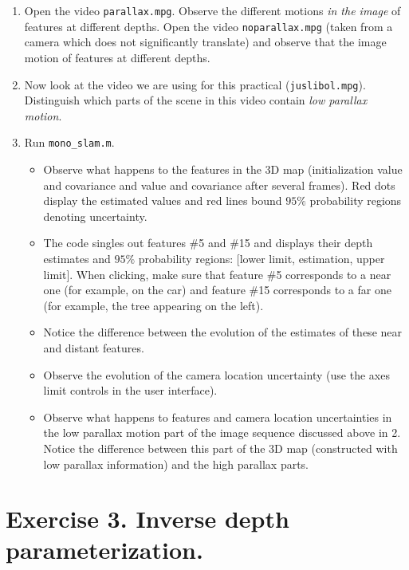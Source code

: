 \documentclass[a4paper,12pt]{article}
\begin{document}
\begin{enumerate}
\item Open the video \texttt{parallax.mpg}.
      Observe the different motions \emph{in the image} of features at
different depths.
      Open the video \texttt{noparallax.mpg} (taken from a camera
which does not significantly translate) and observe that the
image  motion of features at different depths.
\item Now look at the video we are using for this practical (\texttt{juslibol.mpg}).
Distinguish which parts of the scene in this video contain
\emph{low parallax motion}.
\item Run \texttt{mono\_slam.m}.
\begin{itemize}
\item  Observe what happens to the features in the 3D map
(initialization value and covariance and value and covariance
after several frames). Red dots display the estimated values and red
lines bound $95\%$ probability regions denoting uncertainty.
\item The code singles out features \#5 and \#15 and displays their depth
estimates and $95\%$ probability regions: [lower limit,
estimation, upper limit]. When clicking, make sure that feature \#5
corresponds to a near one (for example, on the car) and feature \#15
corresponds to a far one (for example, the tree appearing on the
left).
\item   Notice the difference between the evolution of the estimates
of these near and
distant features.
\item Observe the evolution of the camera location uncertainty
(use the axes limit controls in the user interface).
\item Observe what happens to features and camera location uncertainties
in the low parallax motion part of the image sequence discussed above in 2. Notice
the difference between this part of the 3D map (constructed with
low parallax information) and the high parallax parts.
\end{itemize}
\end{enumerate}




\section{Exercise 3. Inverse depth parameterization.}
\end{document}
